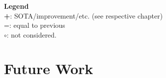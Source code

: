\begin{infobox-progress}
      \vspace{0.5em}
      \begin{footnotesize}
      \textbf{Legend}\\
      \textbf{+}: SOTA/improvement/etc. (see respective chapter)\\
      =: equal to previous\\
      $\circ$: not considered.
      \end{footnotesize}
\end{infobox-progress}

\section{Future Work}
\Blindtext[1]
